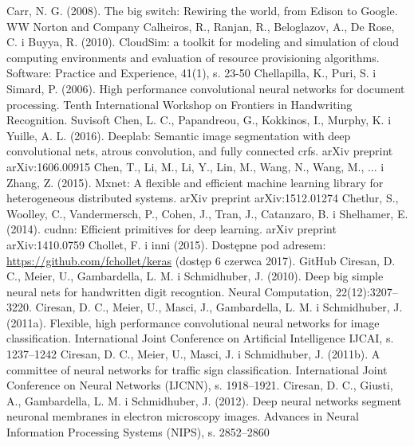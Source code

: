 \documentclass[12pt,a4paper,twoside]{article}
\begin{document}
\begin{thebibliography}{99}
 Carr, N. G. (2008). The big switch: Rewiring the world, from Edison to Google. WW Norton and Company
 Calheiros, R., Ranjan, R., Beloglazov, A., De Rose, C. i Buyya, R. (2010). CloudSim: a toolkit for modeling and simulation of cloud computing environments and evaluation of resource provisioning algorithms. Software: Practice and Experience, 41(1), s. 23-50
 Chellapilla, K., Puri, S. i Simard, P. (2006). High performance convolutional neural networks for document processing. Tenth International Workshop on Frontiers in Handwriting Recognition. Suvisoft
 Chen, L. C., Papandreou, G., Kokkinos, I., Murphy, K. i Yuille, A. L. (2016). Deeplab: Semantic image segmentation with deep convolutional nets, atrous convolution, and fully connected crfs. arXiv preprint arXiv:1606.00915
 Chen, T., Li, M., Li, Y., Lin, M., Wang, N., Wang, M., ... i Zhang, Z. (2015). Mxnet: A flexible and efficient machine learning library for heterogeneous distributed systems. arXiv preprint arXiv:1512.01274
 Chetlur, S., Woolley, C., Vandermersch, P., Cohen, J., Tran, J., Catanzaro, B. i Shelhamer, E. (2014). cudnn: Efficient primitives for deep learning. arXiv preprint arXiv:1410.0759
 Chollet, F. i inni (2015). Dostępne pod adresem: \url{https://github.com/fchollet/keras} (dostęp 6 czerwca 2017). GitHub
 Ciresan, D. C., Meier, U., Gambardella, L. M. i Schmidhuber, J. (2010). Deep big simple neural nets for handwritten digit recogntion. Neural Computation, 22(12):3207–3220.
 Ciresan, D. C., Meier, U., Masci, J., Gambardella, L. M. i Schmidhuber, J. (2011a). Flexible, high performance convolutional neural networks for image classification. International Joint Conference on Artificial Intelligence IJCAI, s. 1237–1242
 Ciresan, D. C., Meier, U., Masci, J. i Schmidhuber, J. (2011b). A committee of neural networks for traffic sign classification. International Joint Conference on Neural Networks (IJCNN), s. 1918–1921.
 Ciresan, D. C., Giusti, A., Gambardella, L. M. i Schmidhuber, J. (2012). Deep neural networks segment neuronal membranes in electron microscopy images. Advances in Neural Information Processing Systems (NIPS), s. 2852–2860

\end{thebibliography}
\end{document}
